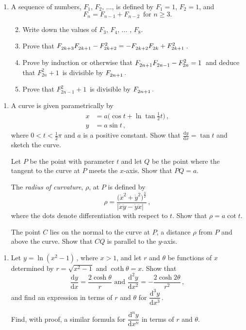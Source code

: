 \documentclass[a4, 11pt]{report}
\newlength{\qspace}
\newcounter{qnumber}
\newenvironment{question}%
 {\vspace{\qspace}
  \begin{enumerate}[\bfseries 1\quad][10]%
    \setcounter{enumi}{\value{qnumber}}%
    \item%
 }
{
  \end{enumerate}
  \filbreak
  \stepcounter{qnumber}
 }
\newenvironment{questionparts}[1][1]%
 {
  \begin{enumerate}[\bfseries (i)]%
    \setcounter{enumii}{#1}
    \addtocounter{enumii}{-1}
    \setlength{\itemsep}{5mm}
    \setlength{\parskip}{8pt}
 }
 {
  \end{enumerate}
 }
\def\d{{\mathrm d}}
\def\ge{\geqslant}
\newcommand{\ds}{\displaystyle}
\begin{document}
\begin{question}
A sequence of numbers, $F_1$, $F_2$, $\ldots$, is defined by
$
F_1=1$, $F_2=1$, and
\[ 
F_n=F_{n-1}+F_{n-2}\, \text{ \ \ \ for $n\ge 3$}.
\]

\begin{questionparts}
\item    Write down the values of $F_3$, $F_4$, $\ldots$ , $F_8$.
\item  Prove that 
$F^{\vphantom{2}}_{2k+3}F^{\vphantom{2}}_{2k+1} -F_{2k+2}^2 
= -F^{\vphantom{2}}_{2k+2}F^{\vphantom{2}}_{2k}+F_{2k+1}^2\,$.
\item Prove by induction or otherwise that
$
F^{\vphantom{2}}_{2n+1}
F^{\vphantom{2}}_{2n-1}-
F^2_{2n}=1\,$
and deduce that $F^2_{2n}+1\,$ is divisible by $F^{\vphantom{2}}_{2n+1}\,.$
\item  Prove that  $F^2_{2n-1}+1\,$ is divisible by 
$F^{\vphantom{2}}_{2n+1}\,.$
\end{questionparts}
\end{question}

\begin{question}
A curve is given parametrically by
\begin{align*}
x&= a\big( \cos t +\ln \tan \tfrac12 t\big)\,,\\
y&= a\sin t\,,
\end{align*}
where $0<t<\frac12 \pi$ and $a$ is a positive constant. Show that 
$\ds \frac{\d y}{\d x} = \tan t$ and sketch the curve.

Let  $P$ be the  point with parameter $t$ and let $Q$ be the 
point where  the tangent 
to the curve at $P$ meets the $x$-axis.
Show that $PQ=a$.

The {\sl radius of curvature}, $\rho$, at $P$ 
 is defined by
\[
\rho=
\frac 
{\big(\dot x ^2+\dot y^2\big)^{\frac32}}
{\vert \dot x \ddot y - \dot y \ddot x\vert   \ \ }
\,,
\]
where the dots denote differentiation with respect to $t$. Show that
$\rho =a\cot t$.

The point  $C$ 
lies on the normal to the curve at $P$, a distance $\rho$ from $P$
and  above the curve.
Show that $CQ$ is parallel to the $y$-axis.
\end{question}

\begin{question}
Let $y = \ln (x^2-1)\,$, where $x  >1$,  and let
 $r$ and $\theta$ be functions of $x$ determined by
$r= \sqrt{x^2-1}$ and $\coth\theta=  x$.
 Show that 
\[
\frac {\d y}{\d x} = \frac {2\cosh \theta}{r}
\text{ \ \ and \ \ }
\frac {\d^2 y}{\d x^2} = -\frac {2 \cosh 2\theta}{r^2}\,,
\]
and find an expression in terms of $r$ and $\theta$ for 
$\dfrac {\d^3 y}{\d x^3}\,$.
 

Find, with proof, 
 a similar formula for $\dfrac{\d^n y}{\d x^n}$ in terms of 
$r$ and $\theta$.
	\end{question}
	
\end{document}

